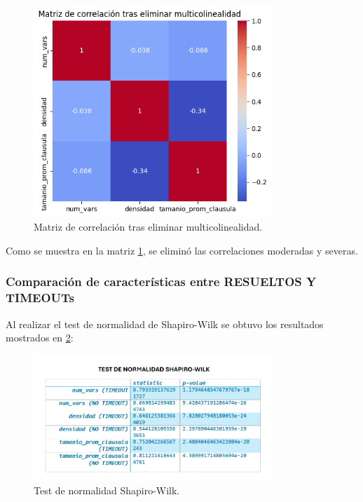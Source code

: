 \begin{figure}[ht]
    \centering
    \includegraphics[width=0.8\textwidth]{Graphics/correlation_matrix_after_delete_multicol.png}
    \caption{Matriz de correlaci\'on tras eliminar multicolinealidad.}
    \label{fig:correlation-matrix-after-delete-multicol}
\end{figure}

Como se muestra en la matriz \ref{fig:correlation-matrix-after-delete-multicol}, se elimin\'o las correlaciones moderadas y severas.

\subsubsection{Comparaci\'on de caracter\'isticas entre RESUELTOS Y TIMEOUTs}

Al realizar el test de normalidad de Shapiro-Wilk se obtuvo los resultados mostrados en \ref{fig:test-shapiro-wilk}:


\begin{figure}[ht]
    \centering
    \includegraphics[width=0.8\textwidth]{Graphics/test_shapiro_wilk.png}
    \caption{Test de normalidad Shapiro-Wilk.}
    \label{fig:test-shapiro-wilk}
\end{figure}

